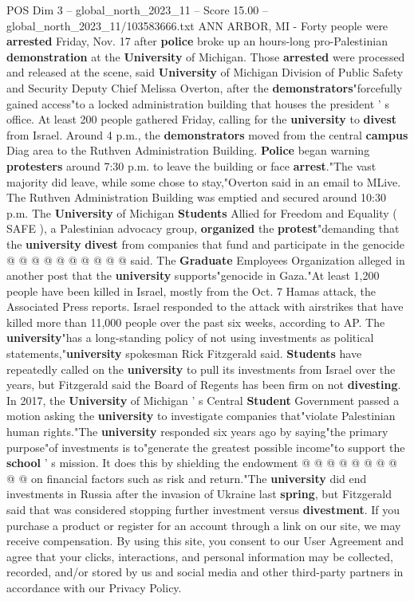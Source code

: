 \begin{textsample}{POS Dim 3 – global\_north\_2023\_11 – Score 15.00 – global\_north\_2023\_11/103583666.txt}  \label{ex:f3_pos_180}
ANN ARBOR, MI - Forty people were \textbf{arrested} Friday, Nov. 17 after \textbf{police} broke up an hours-long pro-Palestinian \textbf{demonstration} at the \textbf{University} of Michigan.
Those \textbf{arrested} were processed and released at the scene, said \textbf{University} of Michigan Division of Public Safety and Security Deputy Chief Melissa Overton, after the \textbf{demonstrators}"forcefully gained access"to a locked administration building that houses the president ' s office.
At least 200 people gathered Friday, calling for the \textbf{university} to \textbf{divest} from Israel.
Around 4 p.m., the \textbf{demonstrators} moved from the central \textbf{campus} Diag area to the Ruthven Administration Building. \textbf{Police} began warning \textbf{protesters} around 7:30 p.m. to leave the building or face \textbf{arrest}."The vast majority did leave, while some chose to stay,"Overton said in an email to MLive.
The Ruthven Administration Building was emptied and secured around 10:30 p.m.
The \textbf{University} of Michigan \textbf{Students} Allied for Freedom and Equality ( SAFE ), a Palestinian advocacy group, \textbf{organized} the \textbf{protest}"demanding that the \textbf{university} \textbf{divest} from companies that fund and participate in the genocide @ @ @ @ @ @ @ @ @ @ said.
The \textbf{Graduate} Employees Organization alleged in another post that the \textbf{university} supports"genocide in Gaza."At least 1,200 people have been killed in Israel, mostly from the Oct. 7 Hamas attack, the Associated Press reports.
Israel responded to the attack with airstrikes that have killed more than 11,000 people over the past six weeks, according to AP.
The \textbf{university}"has a long-standing policy of not using investments as political statements,"\textbf{university} spokesman Rick Fitzgerald said. \textbf{Students} have repeatedly called on the \textbf{university} to pull its investments from Israel over the years, but Fitzgerald said the Board of Regents has been firm on not \textbf{divesting}.
In 2017, the \textbf{University} of Michigan ' s Central \textbf{Student} Government passed a motion asking the \textbf{university} to investigate companies that"violate Palestinian human rights."The \textbf{university} responded six years ago by saying"the primary purpose"of investments is to"generate the greatest possible income"to support the \textbf{school} ' s mission.
It does this by shielding the endowment @ @ @ @ @ @ @ @ @ @ on financial factors such as risk and return."The \textbf{university} did end investments in Russia after the invasion of Ukraine last \textbf{spring}, but Fitzgerald said that was considered stopping further investment versus \textbf{divestment}.
If you purchase a product or register for an account through a link on our site, we may receive compensation.
By using this site, you consent to our User Agreement and agree that your clicks, interactions, and personal information may be collected, recorded, and/or stored by us and social media and other third-party partners in accordance with our Privacy Policy.


\end{textsample}
